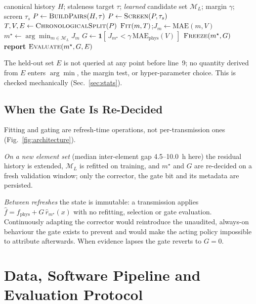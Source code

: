\documentclass[conference]{IEEEtran}
\begin{document}
\begin{algorithm}[t]
\caption{Evidence-Gated Residual Deployment}
\label{alg:gate}
\begin{algorithmic}[1]
\Require canonical history $H$; staleness target $\tau$; \emph{learned}
candidate set $\mathcal{M}_L$; margin $\gamma$; screen $\tau_s$
\State $P \gets \textsc{BuildPairs}(H,\tau)$
\State $P \gets \textsc{Screen}(P,\tau_s)$
\State $T,V,E \gets \textsc{ChronologicalSplit}(P)$
  \State $\textsc{Fit}(m,T)$;\quad $J_m \gets \mathrm{MAE}(m,V)$
\EndFor
\State $m^{\star} \gets \arg\min_{m \in \mathcal{M}_L} J_m$
\State $G \gets \mathbf{1}[\,J_{m^{\star}} < \gamma\,\mathrm{MAE}_{\mathrm{phys}}(V)\,]$
\State $\textsc{Freeze}(m^{\star},G)$
\State \textbf{report} $\textsc{Evaluate}(m^{\star},G,E)$
\end{algorithmic}
\end{algorithm}

The held-out set $E$ is not queried at any point before line~9; no quantity
derived from $E$ enters $\arg\min$, the margin test, or hyper-parameter choice.
This is checked mechanically (Sec.~\ref{sec:stats}).

\subsection{When the Gate Is Re-Decided}
\label{sec:semantics}
Fitting and gating are refresh-time operations, not per-transmission ones
(Fig.~\ref{fig:architecture}).

\emph{On a new element set} (median inter-element gap 4.5--10.0~h here) the
residual history is extended, $\mathcal{M}_L$ is refitted on training, and
$m^{\star}$ and $G$ are re-decided on a fresh validation window; only the
corrector, the gate bit and its metadata are persisted.

\emph{Between refreshes} the state is immutable: a transmission applies
$\hat f = f_{\mathrm{phys}} + G\,\hat r_{m^{\star}}(x)$ with no refitting,
selection or gate evaluation. Continuously adapting the corrector would
reintroduce the unaudited, always-on behaviour the gate exists to prevent and
would make the acting policy impossible to attribute afterwards. When evidence
lapses the gate reverts to $G=0$.

\section{Data, Software Pipeline and Evaluation Protocol}
\label{sec:data}
\end{document}
